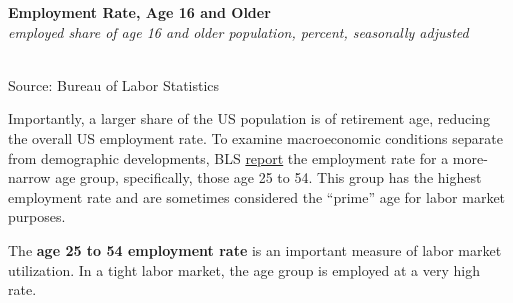 \documentclass{report}
\makeatletter
\newcommand{\tbllink}[1]{\href{https://raw.githubusercontent.com/bdecon/US-chartbook/master/chartbook/data/#1}{\faTable}}
\newcommand*\short[1]{\expandafter\@gobbletwo\number\numexpr#1\relax}
\newcommand{\dateaxisticks}{
		date coordinates in=x, axis line style={draw=none},
		xmax={2023-11-30},
		max space between ticks=40,	    
		xtick={{1990-01-01}, {1992-01-01}, {1994-01-01}, 
			{1996-01-01}, {1998-01-01}, {2000-01-01}, 
			{2002-01-01}, {2004-01-01}, {2006-01-01},
			{2008-01-01}, {2010-01-01}, {2012-01-01}, {2014-01-01},
		    {2016-01-01}, {2018-01-01}, {2020-01-01}, {2022-01-01}, 
		    {2024-01-01}, {2026-01-01}},
		minor xtick={{1989-01-01}, {1991-01-01}, {1993-01-01},
			{1995-01-01}, {1997-01-01}, {1999-01-01}, 
			{2001-01-01}, {2003-01-01}, {2005-01-01}, {2007-01-01},
		    {2009-01-01}, {2011-01-01}, {2013-01-01}, {2015-01-01},
		    {2017-01-01}, {2019-01-01}, {2021-01-01}, {2023-01-01}, 
		    {2025-01-01}, {2027-01-01}},
		enlarge y limits={0.06}, enlarge x limits={0.01},
		xticklabel style={align=center, yshift=-2pt}, tick label style={inner sep=0pt},
		}
\newcommand{\stdline}[4]{\addplot[very thick, no markers, color=#1] 
		table [x=#2, y=#3, col sep=comma] {#4};	}
\newcommand{\rbars}{
		\fill[color=black!10] (axis cs:{1990-07-01},\pgfkeysvalueof{/pgfplots/ymin}) rectangle 
			(axis cs:{1991-03-01}, \pgfkeysvalueof{/pgfplots/ymax});
		\fill[color=black!10] (axis cs:{2007-12-01},\pgfkeysvalueof{/pgfplots/ymin}) rectangle 
			(axis cs:{2009-07-01}, \pgfkeysvalueof{/pgfplots/ymax});
		\fill[color=black!10] (axis cs:{2001-03-01},\pgfkeysvalueof{/pgfplots/ymin}) rectangle 
			(axis cs:{2001-11-01}, \pgfkeysvalueof{/pgfplots/ymax});
		\fill[color=black!10] (axis cs:{2020-02-01},\pgfkeysvalueof{/pgfplots/ymin}) rectangle 
			(axis cs:{2020-05-01}, \pgfkeysvalueof{/pgfplots/ymax});}
\makeatother
\begin{document}
{\begin{minipage}{0.76\textwidth}
 
\vspace{1mm}

\normalsize \textbf{Employment Rate, Age 16 and Older}\\
\footnotesize{\textit{employed share of age 16 and older population, percent, seasonally adjusted}}\\
\hspace*{-1mm} \\
\footnotesize{Source: Bureau of Labor Statistics} \hfill \tbllink{epop.csv}
\vspace{3mm} 

\small Importantly, a larger share of the US population is of retirement age, reducing the overall US employment rate. To examine macroeconomic conditions separate from demographic developments, BLS \href{LNS12300060}{report} the employment rate for a more-narrow age group, specifically, those age 25 to 54. This group has the highest employment rate and are sometimes considered the ``prime'' age for labor market purposes. 

The \textbf{age 25 to 54 employment rate} is an important measure of labor market utilization. In a tight labor market, the age group is employed at a very high rate.  
\vspace{1mm}


\end{minipage}}
\end{document}
